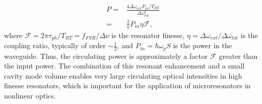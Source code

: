    \begin{align}
   P=&\frac{4\Delta\omega_{ext}P_{in}/T_{RT}}{\Delta\omega_{tot}^2}\\
   =&\frac{2 }{\pi}P_{in}\eta\mathcal{F},
   \end{align}
   where $\mathcal{F}=2\pi\tau_{ph}/T_{RT}=f_{FSR}/\Delta\nu$ is the resonator finesse, $\eta=\Delta\omega_{ext}/\Delta\omega_{tot}$ is the coupling ratio, typically of order $\sim\frac{1}{2}$, and $P_{in}=\hbar\omega_p S$ is the power in the waveguide. Thus, the circulating power is approximately a factor $\mathcal{F}$ greater than the input power. The combination of this resonant enhancement and a small cavity mode volume enables very large circulating optical intensities in high finesse resonators, which is important for the application of microresonators in nonlinear optics. 
   
%   
%   
   
   
  
 
 
